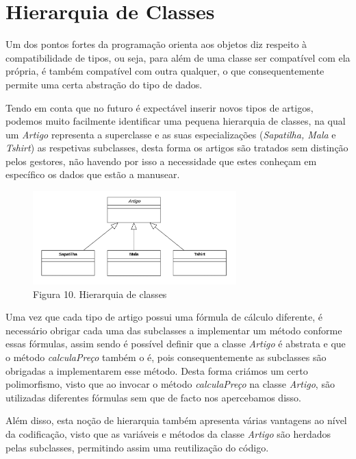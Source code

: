 \chapter{Hierarquia de Classes}

    Um dos pontos fortes da programação orienta aos objetos diz respeito à compatibilidade de tipos, ou seja, para além de uma classe ser compatível com ela própria, é também compatível com outra qualquer, o que consequentemente permite uma certa abstração do tipo de dados.

    Tendo em conta que no futuro é expectável inserir novos tipos de artigos, podemos muito facilmente identificar uma pequena hierarquia de classes, na qual um \textit{Artigo} representa a superclasse e as suas especializações (\textit{Sapatilha, Mala} e \textit{Tshirt}) as respetivas subclasses, desta forma os artigos são tratados sem distinção pelos gestores, não havendo por isso a necessidade que estes conheçam em específico os dados que estão a manusear.

    \vspace{5pt}
    \begin{figure}[hb!]
        \centering
        \includegraphics[width=0.7\textwidth]{imagens/11.png}
        \caption*{Figura 10. Hierarquia de classes}
    \end{figure}

    Uma vez que cada tipo de artigo possui uma fórmula de cálculo diferente, é necessário obrigar cada uma das subclasses a implementar um método conforme essas fórmulas, assim sendo é possível definir que a classe \textit{Artigo} é abstrata e que o método \textit{calculaPreço} também o é, pois consequentemente as subclasses são obrigadas a implementarem esse método. Desta forma criámos um certo polimorfismo, visto que ao invocar o método \textit{calculaPreço} na classe \textit{Artigo}, são utilizadas diferentes fórmulas sem que de facto nos apercebamos disso.

    Além disso, esta noção de hierarquia também apresenta várias vantagens ao nível da codificação, visto que as variáveis e métodos da classe \textit{Artigo} são herdados pelas subclasses, permitindo assim uma reutilização do código. 
    
